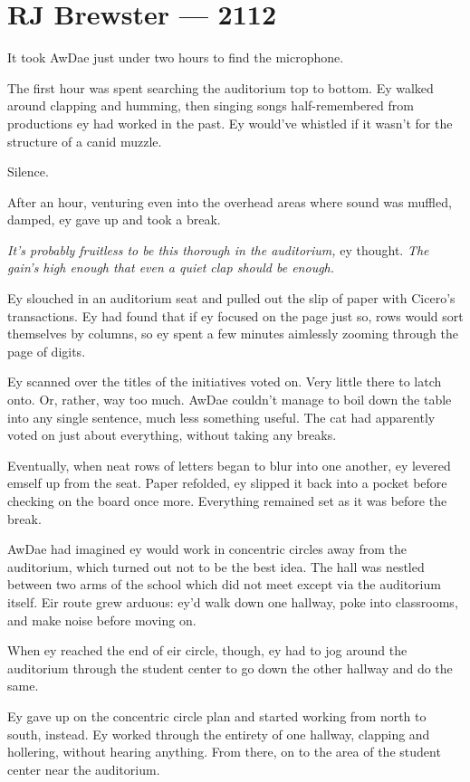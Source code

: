 \hypertarget{rj-brewster-2112}{%
\chapter*{RJ Brewster — 2112}\label{rj-brewster-2112}}

It took AwDae just under two hours to find the microphone.

The first hour was spent searching the auditorium top to bottom. Ey walked around clapping and humming, then singing songs half-remembered from productions ey had worked in the past. Ey would've whistled if it wasn't for the structure of a canid muzzle.

Silence.

After an hour, venturing even into the overhead areas where sound was muffled, damped, ey gave up and took a break.

\emph{It's probably fruitless to be this thorough in the auditorium,} ey thought. \emph{The gain's high enough that even a quiet clap should be enough.}

Ey slouched in an auditorium seat and pulled out the slip of paper with Cicero's transactions. Ey had found that if ey focused on the page just so, rows would sort themselves by columns, so ey spent a few minutes aimlessly zooming through the page of digits.

Ey scanned over the titles of the initiatives voted on. Very little there to latch onto. Or, rather, way too much. AwDae couldn't manage to boil down the table into any single sentence, much less something useful. The cat had apparently voted on just about everything, without taking any breaks.

Eventually, when neat rows of letters began to blur into one another, ey levered emself up from the seat. Paper refolded, ey slipped it back into a pocket before checking on the board once more. Everything remained set as it was before the break.

AwDae had imagined ey would work in concentric circles away from the auditorium, which turned out not to be the best idea. The hall was nestled between two arms of the school which did not meet except via the auditorium itself. Eir route grew arduous: ey'd walk down one hallway, poke into classrooms, and make noise before moving on.

When ey reached the end of eir circle, though, ey had to jog around the auditorium through the student center to go down the other hallway and do the same.

Ey gave up on the concentric circle plan and started working from north to south, instead. Ey worked through the entirety of one hallway, clapping and hollering, without hearing anything. From there, on to the area of the student center near the auditorium.

